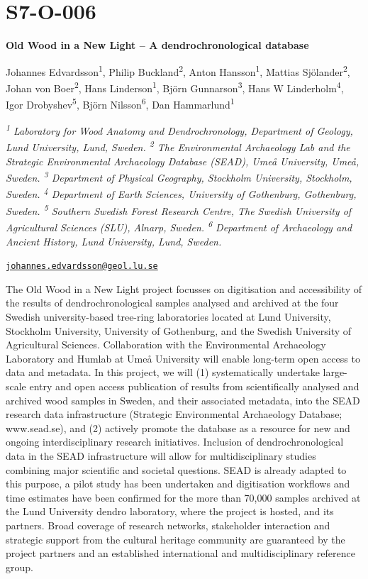 \documentclass[
]{book}
\begin{document}
\hypertarget{s7-o-006}{%
\section*{S7-O-006}\label{s7-o-006}}

\textbf{Old Wood in a New Light -- A dendrochronological database}

Johannes Edvardsson\textsuperscript{1}, Philip Buckland\textsuperscript{2}, Anton Hansson\textsuperscript{1}, Mattias Sjölander\textsuperscript{2}, Johan von Boer\textsuperscript{2}, Hans Linderson\textsuperscript{1}, Björn Gunnarson\textsuperscript{3}, Hans W Linderholm\textsuperscript{4}, Igor Drobyshev\textsuperscript{5}, Björn Nilsson\textsuperscript{6}, Dan Hammarlund\textsuperscript{1}

\emph{\textsuperscript{1} Laboratory for Wood Anatomy and Dendrochronology, Department of Geology, Lund University, Lund, Sweden. \textsuperscript{2} The Environmental Archaeology Lab and the Strategic Environmental Archaeology Database (SEAD), Umeå University, Umeå, Sweden. \textsuperscript{3} Department of Physical Geography, Stockholm University, Stockholm, Sweden. \textsuperscript{4} Department of Earth Sciences, University of Gothenburg, Gothenburg, Sweden. \textsuperscript{5} Southern Swedish Forest Research Centre, The Swedish University of Agricultural Sciences (SLU), Alnarp, Sweden. \textsuperscript{6} Department of Archaeology and Ancient History, Lund University, Lund, Sweden.}

\href{mailto:johannes.edvardsson@geol.lu.se}{\nolinkurl{johannes.edvardsson@geol.lu.se}}

The Old Wood in a New Light project focusses on digitisation and accessibility of the results of dendrochronological samples analysed and archived at the four Swedish university-based tree-ring laboratories located at Lund University, Stockholm University, University of Gothenburg, and the Swedish University of Agricultural Sciences. Collaboration with the Environmental Archaeology Laboratory and Humlab at Umeå University will enable long-term open access to data and metadata. In this project, we will (1) systematically undertake large-scale entry and open access publication of results from scientifically analysed and archived wood samples in Sweden, and their associated metadata, into the SEAD research data infrastructure (Strategic Environmental Archaeology Database; www.sead.se), and (2) actively promote the database as a resource for new and ongoing interdisciplinary research initiatives. Inclusion of dendrochronological data in the SEAD infrastructure will allow for multidisciplinary studies combining major scientific and societal questions. SEAD is already adapted to this purpose, a pilot study has been undertaken and digitisation workflows and time estimates have been confirmed for the more than 70,000 samples archived at the Lund University dendro laboratory, where the project is hosted, and its partners. Broad coverage of research networks, stakeholder interaction and strategic support from the cultural heritage community are guaranteed by the project partners and an established international and multidisciplinary reference group.
\end{document}
